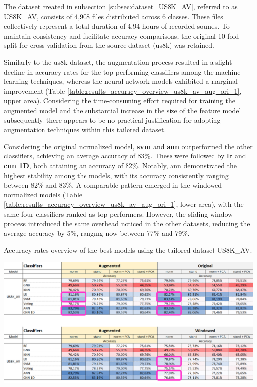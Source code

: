 
The dataset created in subsection \ref{subsec:dataset_US8K_AV}, referred to as US8K\_AV, consists of 4,908 files distributed across 6 classes. These files collectively represent a total duration of 4.94 hours of recorded sounds. To maintain consistency and facilitate accuracy comparisons, the original 10-fold split for cross-validation from the source dataset (\gls{us8k}) was retained.

Similarly to the \gls{us8k} dataset, the augmentation process resulted in a slight decline in accuracy rates for the top-performing classifiers among the machine learning techniques, whereas the neural network models exhibited a marginal improvement (Table \ref{table:results_accuracy_overview_us8k_av_aug_ori_1}, upper area). Considering the time-consuming effort required for training the augmented model and the substantial increase in the size of the feature model subsequently, there appears to be no practical justification for adopting augmentation techniques within this tailored dataset.

Considering the original normalized model, \textbf{\gls{svm}} and \textbf{\gls{ann}} outperformed the other classifiers, achieving an average accuracy of 83\%. These were followed by \textbf{\gls{lr}} and \textbf{\gls{cnn} 1D}, both attaining an accuracy of 82\%. Notably, \gls{ann} demonstrated the highest stability among the models, with its accuracy consistently ranging between 82\% and 83\%. A comparable pattern emerged in the windowed normalized models (Table \ref{table:results_accuracy_overview_us8k_av_aug_ori_1}, lower area), with the same four classifiers ranked as top-performers. However, the sliding window process introduced the same overhead noticed in the other datasets, reducing the average accuracy by 5\%, ranging now between 77\% and 79\%.

\begin{table}[ht!]
    \caption[Accuracy rates overview using the tailored dataset US8K\_AV.]{Accuracy rates overview of the best models using the tailored dataset US8K\_AV.}
    \label{table:results_accuracy_overview_us8k_av_aug_ori_1}
     \raggedright
    \includegraphics[width=1\textwidth]{resources/images/060-results/Results_classification_overview_us8k_av_aug_x_ori_1.png}
\end{table}

